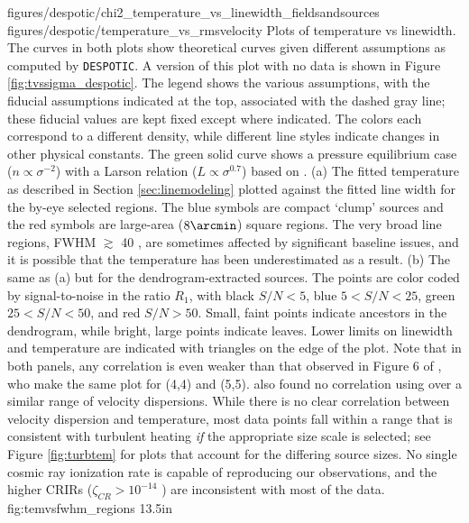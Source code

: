 \FigureTwo
{figures/despotic/chi2_temperature_vs_linewidth_fieldsandsources} %
{figures/despotic/temperature_vs_rmsvelocity} %
{
Plots of temperature vs linewidth.  The curves in both plots show theoretical
curves given different assumptions as computed by \texttt{DESPOTIC}.  
A version of this plot with no data is shown in Figure
\ref{fig:tvssigma_despotic}.
The legend
shows the various assumptions, with the fiducial assumptions indicated at the
top, associated with the dashed gray line; these fiducial values are kept fixed
except where indicated.  The colors each correspond to a different density, while
different line styles indicate changes in other physical constants.
The green solid curve shows a pressure equilibrium case ($n\propto\sigma^{-2}$)
with a Larson relation ($L\propto\sigma^{0.7}$) based on \citet{Shetty2012a}.
(a) 
The fitted temperature as described in Section \ref{sec:linemodeling} plotted
against the fitted line width for the by-eye selected regions.  The blue
symbols are compact `clump' sources and the red symbols are large-area
($8\arcmin$) square regions.  The very broad line regions, FWHM $\gtrsim$ 40
\kms, are sometimes affected by significant baseline issues, and it is possible
that the temperature has been
underestimated as a result.
(b) The same as (a) but for the dendrogram-extracted sources. The points are
color coded by signal-to-noise in the ratio $R_1$, with black $S/N < 5$, blue
$5 < S/N < 25$, green $25 < S/N < 50$, and red $S/N > 50$.  Small, faint points
indicate ancestors in the dendrogram, while bright, large points indicate leaves.
Lower limits on linewidth and temperature are indicated with triangles on the
edge of the plot.  
Note that in both panels, any correlation is even weaker than that observed in
Figure 6 of \citet{Huettemeister1993a}, who make the same plot for \ammonia (4,4)
and (5,5).  \citet{Riquelme2013a} also found no correlation using \ammonia over a similar
range of velocity dispersions.
While there is no clear correlation between velocity dispersion and
temperature, most data points fall within a range that is consistent with
turbulent heating \emph{if} the appropriate size scale is selected; see Figure
\ref{fig:turbtem} for plots that account for the differing source sizes.
No single cosmic ray ionization rate is
capable of reproducing our observations, and the higher CRIRs ($\zeta_{CR} >
10^{-14}$ \pers) are inconsistent with most of the data.
}
{fig:temvsfwhm_regions}
{1}{3.5in}

